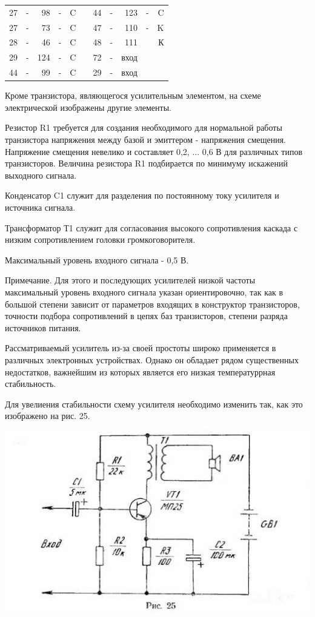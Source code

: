 \documentclass[12pt]{article}
\begin{document}
\hspace{1cm}\begin{tabular}{rcrcrp{3cm}rcrcr}
27  & - & 98  & - & C &   & 44 & - & 123  & - & C\\
27  & - & 73  & - & C &   & 47 & - & 110  & - & K\\
28  & - & 46  & - & C &   & 48 & - & 111  &  & К\\
29  & - & 124 & - & C &   & 72 & - & вход &  & \\
44  & - & 99  & - & C &   & 29 & - & вход &  & \\
\end{tabular}

\hrulefill

Кроме транзистора, являющегося усилительным элементом, на схеме электрической изображены другие элементы.

Резистор R1 требуется для создания необходимого для нормальной работы транзистора напряжения между базой и эмиттером - напряжения смещения. Напряжение смещения невелико и составляет 0,2, ... 0,6 В для различных типов транзисторов. Величина резистора R1 подбирается по минимуму искажений выходного сигнала.

Конденсатор C1 служит для разделения по постоянному току усилителя и источника сигнала.

Трансформатор Т1 служит для согласования высокого сопротивления каскада с низким сопротивлением головки громкоговорителя.

Максимальный уровень входного сигнала - 0,5 В.

{\scriptsize Примечание. Для этого и последующих усилителей низкой частоты максимальный уровень входного сигнала указан ориентировочно, так как в большой степени зависит от параметров входящих в конструктор транзисторов, точности подбора сопротивлений в цепях баз транзисторов, степени разряда источников питания.}

\newpage

Рассматриваемый усилитель из-за своей простоты широко применяется в различных электронных устройствах. Однако он обладает рядом существенных недостатков, важнейшим из которых является его низкая температуррная стабильность.

Для увелиения стабильности схему усилителя необходимо изменить так, как это изображено на рис. 25.

\includegraphics[width=\textwidth]{ekon3_022_1}
\end{document}
